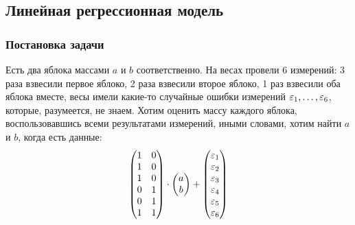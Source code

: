 \subsection{Линейная регрессионная модель}

\subsubsection{Постановка задачи}

\begin{example}
    Есть два яблока массами $a$ и $b$ соответственно. На весах провели 6 измерений: 3 раза взвесили первое яблоко, 2 раза взвесили второе яблоко, 1 раз взвесили оба яблока вместе, весы имели какие-то случайные ошибки измерений $\varepsilon_1, \dots, \varepsilon_6$, которые, разумеется, не знаем. Хотим оценить массу каждого яблока, воспользовавшись всеми результатами измерений, иными словами, хотим найти $a$ и $b$, когда есть данные:
    \[
        \begin{pmatrix}
            1 & 0 \\ 1 & 0 \\ 1 & 0 \\ 0 & 1 \\ 0 & 1 \\ 1 & 1
        \end{pmatrix} \cdot
        \begin{pmatrix}
            a \\ b
        \end{pmatrix} +
        \begin{pmatrix}
            \varepsilon_1 \\ \varepsilon_2 \\ \varepsilon_3 \\ \varepsilon_4 \\ \varepsilon_5 \\ \varepsilon_6
        \end{pmatrix}
    \]
\end{example}

